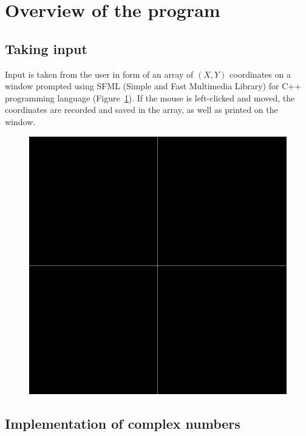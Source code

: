 \documentclass[titlepage]{article}
\begin{document}
\section{Overview of the program} 

\subsection{Taking input}
    
    Input is taken from the user in form of an array of $(X,Y)$ coordinates on 
    a window prompted using SFML (Simple and Fast Multimedia Library) for C++ 
    programming language (Figure~\ref{fig:input_window}). If the mouse is 
    left-clicked and moved, the coordinates
    are recorded and saved in the array, as well as printed on the window. 
    \begin{figure}[H]
        \caption{}
        \centering
        \includegraphics[width=0.3\linewidth]{input_window}
        \label{fig:input_window}
    \end{figure}

\subsection{Implementation of complex numbers}
\end{document}
